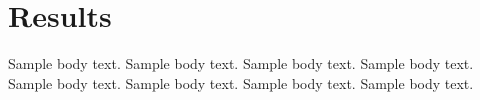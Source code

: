 \section{Results}\label{sec2c}

Sample body text. Sample body text. Sample body text. Sample body text. Sample body text. Sample body text. Sample body text. Sample body text.
